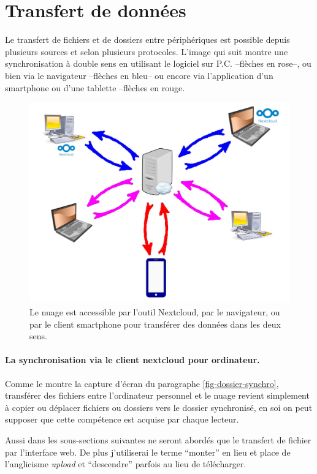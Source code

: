 \section{Transfert de données}
Le transfert de fichiers et de dossiers entre périphériques est possible depuis plusieurs sources et selon plusieurs protocoles. 
L'image qui suit montre une synchronisation à double sens en utilisant le logiciel sur P.C. --flèches en rose--, ou bien via le navigateur --flèches en bleu-- ou encore via l'application d'un smartphone ou d'une tablette --flèches en rouge.
\begin{figure}
	\centering
	\includegraphics{./Captures/synchro.nextcloud.nuage.jpg}
	\caption{Le nuage est accessible par l'outil Nextcloud, par le navigateur, ou par le client smartphone pour transférer des données dans les deux sens.}
\end{figure}

\paragraph{La synchronisation via le client nextcloud pour ordinateur.} 
Comme le montre la capture d'écran du paragraphe \ref{fig-dossier-synchro}, transférer des fichiers entre l'ordinateur personnel et le nuage revient simplement à copier ou déplacer fichiers ou dossiers vers le dossier synchronisé, en soi on peut supposer que cette compétence est acquise par chaque lecteur.

Aussi dans les sous-sections suivantes ne seront abordés que le transfert de fichier par l'interface web.
De plus j'utiliserai le terme ``monter'' en lieu et place de l'anglicisme \emph{upload} et ``descendre'' parfois au lieu de télécharger.

